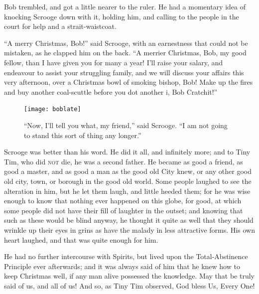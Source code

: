 \documentclass[paper=a5,BCOR=15mm,twoside,DIV=15,headinclude=off,12pt,chapterprefix=off,openany,headings=huge]{scrbook} %
\begin{document}
Bob trembled, and got a little nearer to the ruler. He had a momentary idea of knocking Scrooge down with it, holding him, and calling to the people in the court for help and a strait-waistcoat.

\enquote{A merry Christmas, Bob!} said Scrooge, with an earnestness that could not be mistaken, as he clapped him on the back. \enquote{A merrier Christmas, Bob, my good fellow, than I have given you for many a year! I'll raise your salary, and endeavour to assist your struggling family, and we will discuss your affairs this very afternoon, over a Christmas bowl of smoking bishop, Bob! Make up the fires and buy another coal-scuttle before you dot another i, Bob Cratchit!}

\begin{figure}[p]
\begin{minipage}[c]{\linewidth}
\texttt{[image: boblate]}
\caption*{\enquote{Now, I'll tell you what, my friend,} said Scrooge. \enquote{I am not going to stand this sort of thing any longer.}}
\end{minipage}
\end{figure}

Scrooge was better than his word. He did it all, and infinitely more; and to Tiny Tim, who did \textsc{not} die, he was a second father. He became as good a friend, as good a master, and as good a man as the good old City knew, or any other good old city, town, or borough in the good old world. Some people laughed to see the alteration in him, but he let them laugh, and little heeded them; for he was wise enough to know that nothing ever happened on this globe, for good, at which some people did not have their fill of laughter in the outset; and knowing that such as these would be blind anyway, he thought it quite as well that they should wrinkle up their eyes in grins as have the malady in less attractive forms. His own heart laughed, and that was quite enough for him.

He had no further intercourse with Spirits, but lived upon the Total-Abstinence Principle ever afterwards; and it was always said of him that he knew how to keep Christmas well, if any man alive possessed the knowledge. May that be truly said of us, and all of us! And so, as Tiny Tim observed, God bless Us, Every One!
\end{document}
